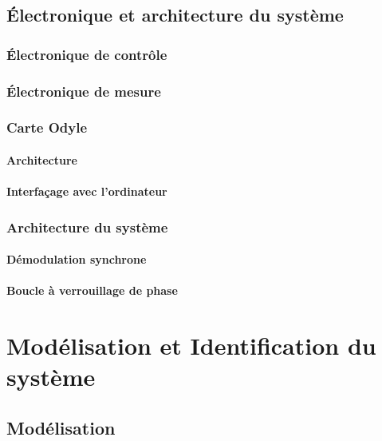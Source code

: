 \section{\'Electronique et architecture du système}

\subsection{\'Electronique de contrôle}

\subsection{\'Electronique de mesure}

\subsection{Carte Odyle}
\subsubsection{Architecture}
\subsubsection{Interfaçage avec l'ordinateur}

\subsection{Architecture du système}
\subsubsection{Démodulation synchrone}
\subsubsection{Boucle à verrouillage de phase}


\cleardoublepage{}
\chapter{Modélisation et Identification du système}

\section{Modélisation}

